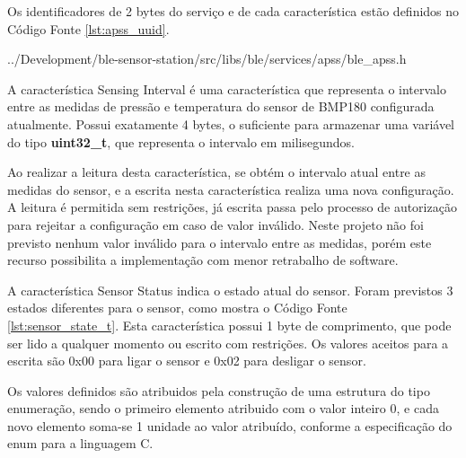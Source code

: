 
Os identificadores de 2 bytes do serviço e de cada característica estão
definidos no Código Fonte \ref{lst:apss_uuid}. 

\begin{minipage}{0.95\linewidth}

{../Development/ble-sensor-station/src/libs/ble/services/apss/ble_apss.h}
\end{minipage}

A característica Sensing Interval é uma característica que representa o
intervalo entre as medidas de pressão e temperatura do sensor de BMP180
configurada atualmente. Possui exatamente 4 bytes, o suficiente para armazenar
uma variável do tipo \textbf{uint32\_t}, que representa o intervalo em
milisegundos.

Ao realizar a leitura desta característica, se obtém o intervalo atual entre as
medidas do sensor, e a escrita nesta característica realiza uma nova
configuração. A leitura é permitida sem restrições, já escrita passa pelo
processo de autorização para rejeitar a configuração em caso de valor
inválido. Neste projeto não foi previsto nenhum valor inválido para o intervalo
entre as medidas, porém este recurso possibilita a implementação com menor
retrabalho de software.

A característica Sensor Status indica o estado atual do sensor. Foram previstos
3 estados diferentes para o sensor, como mostra o Código Fonte
\ref{lst:sensor_state_t}. Esta característica possui 1 byte de comprimento, que
pode ser lido a qualquer momento ou escrito com restrições. Os valores aceitos
para a escrita são 0x00 para ligar o sensor e 0x02 para
desligar o sensor.

Os valores definidos são atribuidos pela construção de uma estrutura do tipo
enumeração, sendo o primeiro elemento atribuido com o valor inteiro 0, e
cada novo elemento soma-se 1 unidade ao valor atribuído, conforme
a especificação do enum para a linguagem C.\cite{C99Spec}

